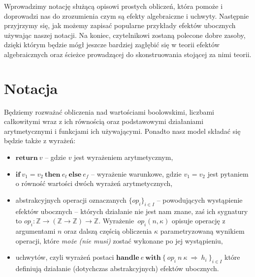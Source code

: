 \documentclass[shortabstract]{iithesis}
\begin{document}
Wprowadzimy notację służącą opisowi prostych obliczeń, która pomoże i doprowadzi nas do zrozumienia czym są efekty algebraiczne i uchwyty. Następnie przyjrzymy się, jak możemy zapisać popularne przykłady efektów ubocznych używając naszej notacji. Na koniec, czytelnikowi zostaną polecone dobre zasoby, dzięki którym będzie mógł jeszcze bardziej zagłębić się w teorii efektów algebraicznych oraz ścieżce prowadzącej do skonstruowania stojącej za nimi teorii.

\section{Notacja}

\newcommand{\return}[1]{\mathbf{return}\ #1}
\newcommand{\op}[3]{op_{#1}(#2, #3)}
\newcommand{\handle}[2]{\mathbf{handle}\ #1\ \mathbf{with}\ #2}
\newcommand{\hcase}[3]{#1\ #2\ \Rightarrow\ #3}
\newcommand{\fun}[2]{\lambda #1.\ #2}
\newcommand{\eval}[1]{\llbracket\, #1\, \rrbracket}
\newcommand{\cond}[3]{\mathbf{if}\ #1\ \mathbf{then}\ #2\ \mathbf{else}\ #3}



Będziemy rozważać obliczenia nad wartościami boolowskimi, liczbami całkowitymi wraz z ich równością oraz podstawowymi działaniami arytmetycznymi i funkcjami ich używającymi. Ponadto nasz model składać się będzie także z wyrażeń:
\begin{itemize}
\item \(\return{v}\) -- gdzie \(v\) jest wyrażeniem arytmetycznym,
\item \(\cond{v_1 = v_2}{e_t}{e_f}\) -- wyrażenie warunkowe, gdzie \(v_1 = v_2\) jest pytaniem o równość wartości dwóch wyrażeń arytmetycznych,
\item abstrakcyjnych operacji oznaczanych \(\{op_i\}_{i \in I}\) -- powodujących wystąpienie efektów ubocznych -- których działanie nie jest nam znane, zaś ich sygnatury to \(op_i: \mathbb{Z} \rightarrow (\mathbb{Z} \rightarrow \mathbb{Z}) \rightarrow \mathbb{Z}\). Wyrażenie~\(\op{i}{n}{\kappa}\) opisuje operację z argumentami \(n\) oraz dalszą częścią obliczenia \(\kappa\) parametryzowaną wynikiem operacji, które \textit{może (nie musi)} zostać wykonane po jej wystąpieniu,
\item uchwytów, czyli wyrażeń postaci \(\handle{e}{\{\ \hcase{op_i}{n\ \kappa}{h_i}\ \}_{i \in I}}\) które definiują działanie (dotychczas abstrakcyjnych) efektów ubocznych. 

\end{itemize}
\end{document}
